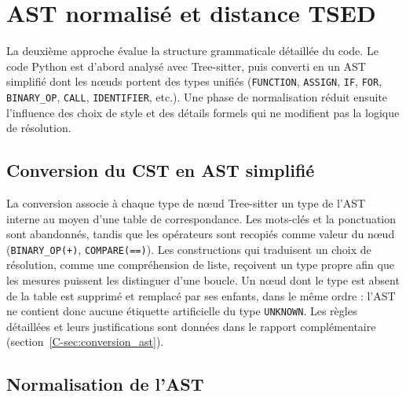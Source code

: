 \documentclass[12pt,a4paper,oneside]{report}
\begin{document}
\section{AST normalisé et distance TSED}

La deuxième approche évalue la structure grammaticale détaillée du code. Le
code Python est d'abord analysé avec Tree-sitter, puis converti en un AST
simplifié dont les nœuds portent des types unifiés (\texttt{FUNCTION},
\texttt{ASSIGN}, \texttt{IF}, \texttt{FOR}, \texttt{BINARY\_OP}, \texttt{CALL},
\texttt{IDENTIFIER}, etc.). Une phase de normalisation réduit ensuite
l'influence des choix de style et des détails formels qui ne modifient pas la
logique de résolution.

\subsection{Conversion du CST en AST simplifié}
\label{sec:conversion_ast}

La conversion associe à chaque type de nœud Tree-sitter un type de l'AST
interne au moyen d'une table de correspondance. Les mots-clés et la
ponctuation sont abandonnés, tandis que les opérateurs sont recopiés comme
valeur du nœud (\texttt{BINARY\_OP(+)}, \texttt{COMPARE(==)}). Les
constructions qui traduisent un choix de résolution, comme une compréhension
de liste, reçoivent un type propre afin que les mesures puissent les
distinguer d'une boucle. Un nœud dont le type est absent de la table est
supprimé et remplacé par ses enfants, dans le même ordre : l'AST ne contient
donc aucune étiquette artificielle du type \texttt{UNKNOWN}. Les règles
détaillées et leurs justifications sont données dans le rapport
complémentaire (section~\ref{C-sec:conversion_ast}).


\subsection{Normalisation de l'AST}
\end{document}
